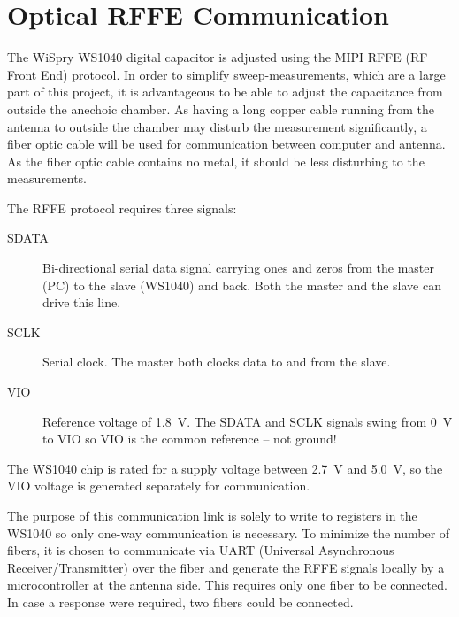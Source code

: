 \chapter{Optical RFFE Communication}
\label{cha:optical_rffe_comm}
The WiSpry WS1040 digital capacitor is adjusted using the MIPI RFFE (RF Front End) protocol. In order to simplify sweep-measurements, which are a large part of this project, it is advantageous to be able to adjust the capacitance from outside the anechoic chamber. As having a long copper cable running from the antenna to outside the chamber may disturb the measurement significantly, a fiber optic cable will be used for communication between computer and antenna. As the fiber optic cable contains no metal, it should be less disturbing to the measurements.

The RFFE protocol requires three signals:
\begin{description}
    \item[SDATA] Bi-directional serial data signal carrying ones and zeros from the master (PC) to the slave (WS1040) and back. Both the master and the slave can drive this line.
    \item[SCLK] Serial clock. The master both clocks data to and from the slave.
    \item[VIO] Reference voltage of \SI{1.8}{V}. The SDATA and SCLK signals swing from \SI{0}{V} to VIO so VIO is the common reference -- not ground!
\end{description}
The WS1040 chip is rated for a supply voltage between \SI{2.7}{V} and \SI{5.0}{V}, so the VIO voltage is generated separately for communication.

The purpose of this communication link is solely to write to registers in the WS1040 so only one-way communication is necessary. To minimize the number of fibers, it is chosen to communicate via UART (Universal Asynchronous Receiver/Transmitter) over the fiber and generate the RFFE signals locally by a microcontroller at the antenna side. This requires only one fiber to be connected. In case a response were required, two fibers could be connected.

